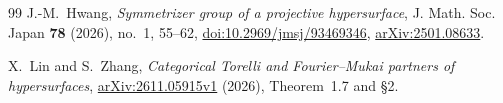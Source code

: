\documentclass[11pt,a4paper]{ltjsarticle}
\numberwithin{equation}{section}
\begin{document}
\begin{thebibliography}{99}
J.-M.~Hwang,
\textit{Symmetrizer group of a projective hypersurface},
J. Math. Soc. Japan \textbf{78} (2026), no.~1, 55--62,
\href{https://doi.org/10.2969/jmsj/93469346}{doi:10.2969/jmsj/93469346},
\href{https://arxiv.org/abs/2501.08633}{arXiv:2501.08633}.

X.~Lin and S.~Zhang,
\emph{Categorical Torelli and Fourier--Mukai partners of hypersurfaces},
\href{https://arxiv.org/abs/2611.05915v1}{arXiv:2611.05915v1} (2026),
Theorem~1.7 and \S2.

\end{thebibliography}
\end{document}
